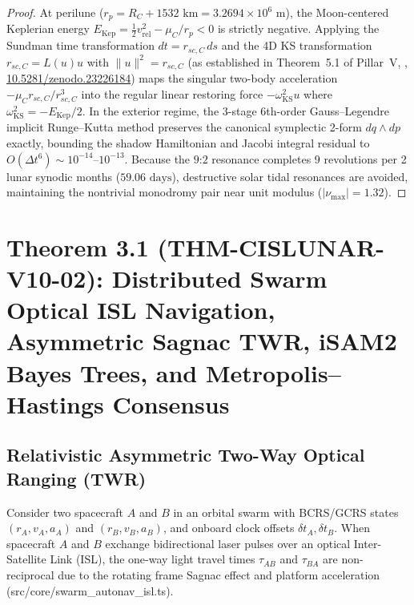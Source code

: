 \documentclass[11pt,a4paper,reqno]{article}
\def\bm#1{#1}%
\def\texttt#1{#1}%
\def\mathcal#1{#1}%
\def\mathbb#1{#1}%
\newcommand{\zenodo}[1]{\href{https://doi.org/10.5281/zenodo.#1}{\texttt{10.5281/\allowbreak zenodo.#1}}}
\theoremstyle{plain}
\theoremstyle{definition}
\theoremstyle{remark}
\numberwithin{equation}{section}
\begin{document}
\begin{proof}
At perilune ($r_p = R_{\mathbb{C}} + 1532\text{ km} = 3.2694 \times 10^6\text{ m}$), the Moon-centered Keplerian energy $E_{\text{Kep}} = \frac{1}{2}v_{\text{rel}}^2 - \mu_{\mathbb{C}} / r_p < 0$ is strictly negative. Applying the Sundman time transformation $dt = r_{sc,\mathbb{C}}\,ds$ and the 4D KS transformation $\bm{r}_{sc,\mathbb{C}} = \bm{L}(\bm{u})\bm{u}$ with $\|\bm{u}\|^2 = r_{sc,\mathbb{C}}$ (as established in Theorem~5.1 of Pillar~V, \cite{UnmaniPillarV2026}, \zenodo{23226184}) maps the singular two-body acceleration $-\mu_{\mathbb{C}}\bm{r}_{sc,\mathbb{C}}/r_{sc,\mathbb{C}}^3$ into the regular linear restoring force $-\omega_{\text{KS}}^2 \bm{u}$ where $\omega_{\text{KS}}^2 = -E_{\text{Kep}}/2$. In the exterior regime, the 3-stage 6th-order Gauss--Legendre implicit Runge--Kutta method preserves the canonical symplectic 2-form $d\bm{q} \wedge d\bm{p}$ exactly, bounding the shadow Hamiltonian and Jacobi integral residual to $\mathcal{O}(\Delta t^6) \sim 10^{-14}$--$10^{-13}$. Because the $9\text{:}2$ resonance completes 9 revolutions per 2 lunar synodic months ($59.06\text{ days}$), destructive solar tidal resonances are avoided, maintaining the nontrivial monodromy pair near unit modulus ($|\nu_{\max}| = 1.32$).
\end{proof}

\section{\texorpdfstring{Theorem 3.1 (\texttt{THM-CISLUNAR-V10-02}): Distributed Swarm Optical ISL Navigation, Asymmetric Sagnac TWR, iSAM2 Bayes Trees, and Metropolis--Hastings Consensus}{Theorem 3.1 (THM-CISLUNAR-V10-02): Distributed Swarm Optical ISL Navigation, Asymmetric Sagnac TWR, iSAM2 Bayes Trees, and Metropolis-Hastings Consensus}}

\subsection{Relativistic Asymmetric Two-Way Optical Ranging (TWR)}
Consider two spacecraft $A$ and $B$ in an orbital swarm with BCRS/GCRS states $(\bm{r}_A, \bm{v}_A, \bm{a}_A)$ and $(\bm{r}_B, \bm{v}_B, \bm{a}_B)$, and onboard clock offsets $\delta t_A, \delta t_B$. When spacecraft $A$ and $B$ exchange bidirectional laser pulses over an optical Inter-Satellite Link (ISL), the one-way light travel times $\tau_{AB}$ and $\tau_{BA}$ are non-reciprocal due to the rotating frame Sagnac effect and platform acceleration (\texttt{src/core/swarm\_autonav\_isl.ts}).
\end{document}
